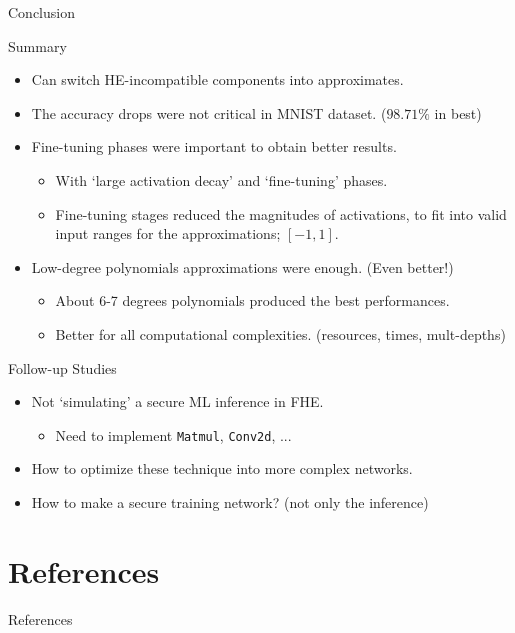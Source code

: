 \documentclass[9pt]{beamer}
\begin{document}
\begin{frame}{Conclusion}
    \begin{alertblock}{Summary}
        \begin{itemize}
            \item Can switch HE-incompatible components into approximates.
            \item The accuracy drops were not critical in MNIST dataset. ($98.71\%$ in best)
            \item Fine-tuning phases were important to obtain better results.
                  \begin{itemize}
                      \item With `large activation decay' and `fine-tuning' phases.
                      \item Fine-tuning stages reduced the magnitudes of activations, to fit into valid input ranges for the approximations; $[-1, 1]$.
                  \end{itemize}
            \item \alert{Low-degree polynomials approximations were enough. (Even better!)}
                  \begin{itemize}
                      \item About 6-7 degrees polynomials produced the best performances.
                      \item Better for all computational complexities. (resources, times, mult-depths)
                  \end{itemize}
        \end{itemize}
    \end{alertblock}
    \begin{block}{Follow-up Studies}
        \begin{itemize}
            \item Not `simulating' a secure ML inference in FHE.
                  \begin{itemize}
                      \item Need to implement \texttt{Matmul}, \texttt{Conv2d}, ...
                  \end{itemize}
            \item How to optimize these technique into more complex networks.
            \item How to make a secure \alert{training} network? (not only the inference)
        \end{itemize}
    \end{block}
\end{frame}

\section{References}

\begin{frame}[t,allowframebreaks]{References}
    \nocite{*}
    \printbibliography
\end{frame}
\end{document}
